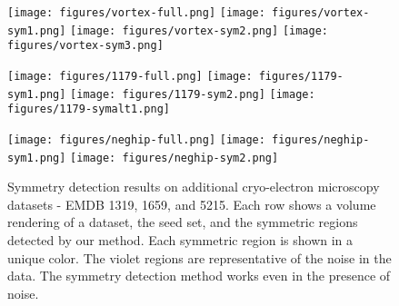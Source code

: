 \documentclass[review,journal]{vgtc}         %
\begin{document}
\begin{figure*}
\centering
\begin{minipage}{0.33\textwidth}
	\centering
	\subfigure
	{
		\texttt{[image: figures/vortex-full.png]}
	}
	\subfigure
	{
		\texttt{[image: figures/vortex-sym1.png]}
	}
	\subfigure
	{
		\texttt{[image: figures/vortex-sym2.png]}
	}
	\subfigure
	{
		\texttt{[image: figures/vortex-sym3.png]}
	}
\end{minipage}
\begin{minipage}{0.33\textwidth}
	\centering
	\subfigure
	{
		\texttt{[image: figures/1179-full.png]}
	}
	\subfigure
	{
		\texttt{[image: figures/1179-sym1.png]}
	}
	\subfigure
	{
		\texttt{[image: figures/1179-sym2.png]}
	}
	\subfigure
	{
		\texttt{[image: figures/1179-symalt1.png]}
	}
\end{minipage}
\begin{minipage}{0.33\textwidth}
	\subfigure
	{
		\texttt{[image: figures/neghip-full.png]}
	}
	\subfigure
	{
		\texttt{[image: figures/neghip-sym1.png]}
	}
	\subfigure
	{
		\texttt{[image: figures/neghip-sym2.png]}
	}
\end{minipage}
\caption{\label{emdfigs}Symmetry detection results on additional cryo-electron microscopy datasets - EMDB 1319, 1659, and 5215.
Each row shows a volume rendering of a dataset, the seed set, and
the symmetric regions detected by our method. Each symmetric region is shown in a unique color.
The violet regions are representative of the noise in the data. The symmetry detection method
works even in the presence of noise.}
\end{figure*}
\end{document}
